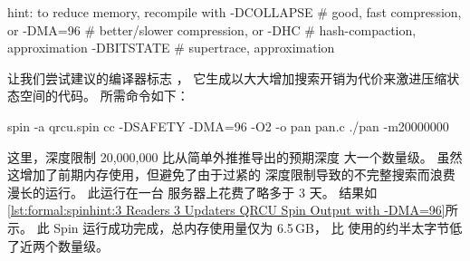 \begin{VerbatimU}
hint: to reduce memory, recompile with
  -DCOLLAPSE # good, fast compression, or
  -DMA=96   # better/slower compression, or
  -DHC # hash-compaction, approximation
  -DBITSTATE # supertrace, approximation
\end{VerbatimU}

让我们尝试建议的编译器标志 ，
它生成以大大增加搜索开销为代价来激进压缩状态空间的代码。
所需命令如下：

\begin{VerbatimU}
spin -a qrcu.spin
cc -DSAFETY -DMA=96 -O2 -o pan pan.c
./pan -m20000000
\end{VerbatimU}

这里，深度限制 20,000,000 比从简单外推推导出的预期深度
大一个数量级。
虽然这增加了前期内存使用，但避免了由于过紧的
深度限制导致的不完整搜索而浪费漫长的运行。
此运行在一台  服务器上花费了略多于 3 天。
结果如
\cref{lst:formal:spinhint:3 Readers 3 Updaters QRCU Spin Output with -DMA=96}所示。
此 Spin 运行成功完成，总内存使用量仅为 6.5\,GB，
比  使用的约半太字节低了近两个数量级。

\begin{listing}
\vspace*{-9pt}
\caption{使用  的 3 读者 3 更新者 QRCU Spin 输出}
\label{lst:formal:spinhint:3 Readers 3 Updaters QRCU Spin Output with -DMA=96}
\end{listing}

\QuickQuizEnd

